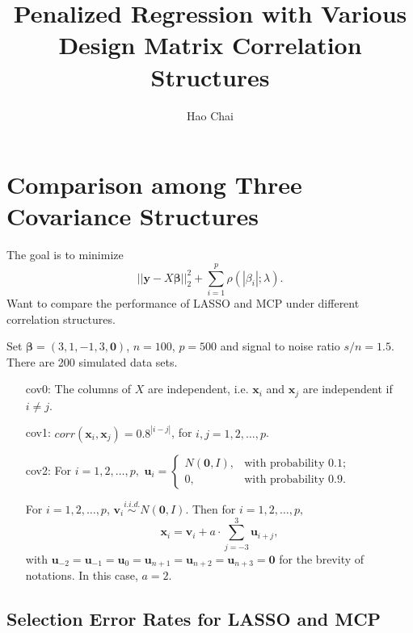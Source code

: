 \documentclass{beamer}
\newcommand{\bm}[1]{{\boldsymbol {#1}}}
\newcommand\makebeamertitle{\frame{\maketitle}}%
\def\frameend{} %
\begin{document}
\title{Penalized Regression with Various Design Matrix Correlation Structures}


\author{Hao Chai}



\makebeamertitle
\frameend{}

\section{Comparison among Three Covariance Structures}

The goal is to minimize $$||\mathbf{y}-X\bm\beta||^2_2+\sum_{i=1}^p\rho(|\beta_i|;\lambda).$$
\pause
Want to compare the performance of LASSO and MCP under different correlation structures.

Set $\bm\beta=(3, 1, -1, 3, \mathbf{0})$, $n=100$, $p=500$ and signal to noise ratio $s/n = 1.5$.
There are 200 simulated data sets.

\frameend{}

\begin{enumerate}
\item[cov0:]The columns of $X$ are independent, i.e. $\mathbf{x}_i$ and $\mathbf{x}_j$ are independent if $i\neq j$.
\item[cov1:]$corr(\mathbf{x}_i,\mathbf{x}_j)=0.8^{|i-j|}$, for $i,j=1, 2, \ldots, p$.
\item[cov2:]For $i=1, 2, \ldots, p,$ $\mathbf{u}_i=\begin{cases}N(\mathbf{0},I),& \mbox{with probability 0.1};\\
0, & \mbox{with probability 0.9}.
\end{cases}$

For $i=1, 2, \ldots, p$, $\mathbf{v}_i\stackrel{i.i.d.}\sim N(\mathbf{0}, I)$.
Then for $i=1, 2, \ldots, p, $
$$\mathbf{x}_i=\mathbf{v}_i+a \cdot \sum_{j=-3}^3\mathbf{u}_{i+j},$$
with $\mathbf{u}_{-2}=\mathbf{u}_{-1}=\mathbf{u}_{0}=\mathbf{u}_{n+1}=\mathbf{u}_{n+2}=\mathbf{u}_{n+3}=\mathbf{0}$ for the brevity of notations. In this case, $a =2$.
\end{enumerate}
\frameend{}

\subsection{Selection Error Rates for LASSO and MCP}
\end{document}
